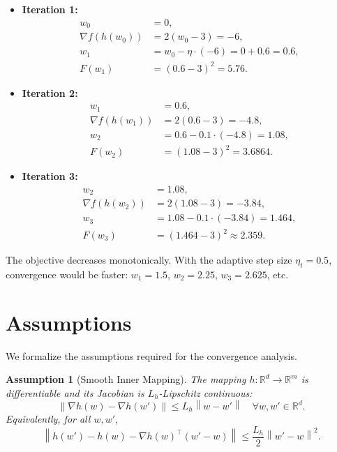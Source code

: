 \documentclass{article}
\newcommand{\R}{\mathbb{R}}
\newcommand{\norm}[1]{\left\| #1 \right\|}
\newtheorem{assumption}{Assumption}
\begin{document}
\begin{itemize}
    \item \textbf{Iteration 1:}
    \begin{align*}
        w_0 &= 0, \\
        \nabla f(h(w_0)) &= 2(w_0 - 3) = -6, \\
        w_1 &= w_0 - \eta \cdot (-6) = 0 + 0.6 = 0.6, \\
        F(w_1) &= (0.6 - 3)^2 = 5.76.
    \end{align*}
    \item \textbf{Iteration 2:}
    \begin{align*}
        w_1 &= 0.6, \\
        \nabla f(h(w_1)) &= 2(0.6 - 3) = -4.8, \\
        w_2 &= 0.6 - 0.1 \cdot (-4.8) = 1.08, \\
        F(w_2) &= (1.08 - 3)^2 = 3.6864.
    \end{align*}
    \item \textbf{Iteration 3:}
    \begin{align*}
        w_2 &= 1.08, \\
        \nabla f(h(w_2)) &= 2(1.08 - 3) = -3.84, \\
        w_3 &= 1.08 - 0.1 \cdot (-3.84) = 1.464, \\
        F(w_3) &= (1.464 - 3)^2 \approx 2.359.
    \end{align*}
\end{itemize}
The objective decreases monotonically. With the adaptive step size $\eta_t = 0.5$, convergence would be faster: $w_1 = 1.5$, $w_2 = 2.25$, $w_3 = 2.625$, etc.

\section*{Assumptions}

We formalize the assumptions required for the convergence analysis.

\begin{assumption}[Smooth Inner Mapping] \label{assump:h_smooth}
The mapping $h: \R^d \to \R^m$ is differentiable and its Jacobian is $L_h$-Lipschitz continuous:
\begin{equation}
    \norm{\nabla h(w) - \nabla h(w')} \le L_h \norm{w - w'} \quad \forall w, w' \in \R^d.
\end{equation}
Equivalently, for all $w, w'$,
\begin{equation}
    \norm{h(w') - h(w) - \nabla h(w)^\top (w' - w)} \le \frac{L_h}{2} \norm{w' - w}^2.
\end{equation}
\end{assumption}
\end{document}
